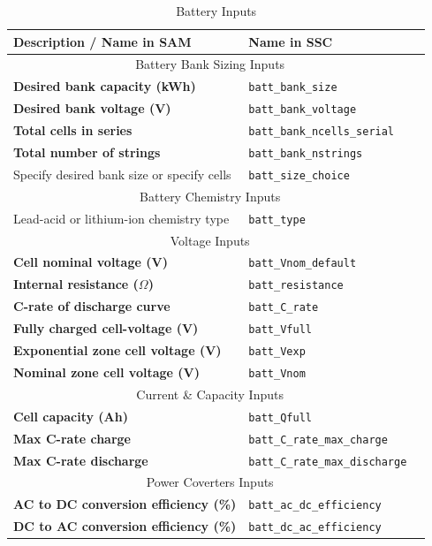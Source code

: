 \documentclass[12pt,letterpaper]{article}
\begin{document}
\begin{table}
\begin{center}
\caption{Battery Inputs}
\begin{tabular}{lll}
\midrule
Description / \textbf{Name in SAM} & Name in SSC \\
\midrule
\multicolumn{2}{c}{Battery Bank Sizing Inputs}\\
\textbf{Desired bank capacity (kWh)} & \texttt{batt\_bank\_size} \\
\textbf{Desired bank voltage (V)} & \texttt{batt\_bank\_voltage} \\
\textbf{Total cells in series} & \texttt{batt\_bank\_ncells\_serial} \\
\textbf{Total number of strings} & \texttt{batt\_bank\_nstrings} \\
Specify desired bank size or specify cells & \texttt{batt\_size\_choice} \\
\midrule
\multicolumn{2}{c}{Battery Chemistry Inputs}\\
Lead-acid or lithium-ion chemistry type & \texttt{batt\_type} \\
\midrule
\multicolumn{2}{c}{Voltage Inputs}\\
\textbf{Cell nominal voltage (V)} & \texttt{batt\_Vnom\_default} \\
\textbf{Internal resistance ($\Omega$)} & \texttt{batt\_resistance} \\
\textbf{C-rate of discharge curve} & \texttt{batt\_C\_rate} \\
\textbf{Fully charged cell-voltage (V)} & \texttt{batt\_Vfull} \\
\textbf{Exponential zone cell voltage (V)} & \texttt{batt\_Vexp} \\
\textbf{Nominal zone cell voltage (V)} & \texttt{batt\_Vnom} \\
\midrule
\multicolumn{2}{c}{Current \& Capacity Inputs}\\
\textbf{Cell capacity (Ah)} & \texttt{batt\_Qfull} \\
\textbf{Max C-rate charge} & \texttt{batt\_C\_rate\_max\_charge} \\
\textbf{Max C-rate discharge} & \texttt{batt\_C\_rate\_max\_discharge} \\
\midrule
\multicolumn{2}{c}{Power Coverters Inputs}\\
\textbf{AC to DC conversion efficiency (\%)} & \texttt{batt\_ac\_dc\_efficiency} \\
\textbf{DC to AC conversion efficiency (\%)} & \texttt{batt\_dc\_ac\_efficiency} \\

\end{tabular}
\end{center}
\end{table}
\end{document}
